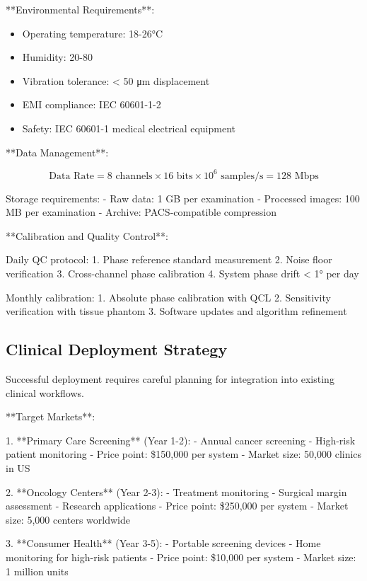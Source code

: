 \documentclass[12pt,a4paper]{report}
\begin{document}
**Environmental Requirements**:

\begin{itemize}
\item Operating temperature: 18-26°C
\item Humidity: 20-80%
\item Vibration tolerance: < 50 μm displacement
\item EMI compliance: IEC 60601-1-2
\item Safety: IEC 60601-1 medical electrical equipment
\end{itemize}

**Data Management**:

\begin{equation}
\text{Data Rate} = 8 \text{ channels} \times 16 \text{ bits} \times 10^6 \text{ samples/s} = 128 \text{ Mbps}
\end{equation}

Storage requirements:
- Raw data: 1 GB per examination
- Processed images: 100 MB per examination
- Archive: PACS-compatible compression

**Calibration and Quality Control**:

Daily QC protocol:
1. Phase reference standard measurement
2. Noise floor verification
3. Cross-channel phase calibration
4. System phase drift < 1° per day

Monthly calibration:
1. Absolute phase calibration with QCL
2. Sensitivity verification with tissue phantom
3. Software updates and algorithm refinement

\subsection{Clinical Deployment Strategy}

Successful deployment requires careful planning for integration into existing clinical workflows.

**Target Markets**:

1. **Primary Care Screening** (Year 1-2):
   - Annual cancer screening
   - High-risk patient monitoring
   - Price point: \$150,000 per system
   - Market size: 50,000 clinics in US

2. **Oncology Centers** (Year 2-3):
   - Treatment monitoring
   - Surgical margin assessment
   - Research applications
   - Price point: \$250,000 per system
   - Market size: 5,000 centers worldwide

3. **Consumer Health** (Year 3-5):
   - Portable screening devices
   - Home monitoring for high-risk patients
   - Price point: \$10,000 per system
   - Market size: 1 million units
\end{document}
